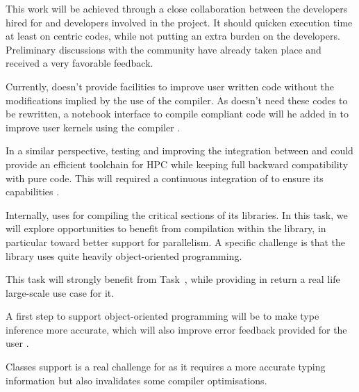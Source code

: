 \begin{workpackage}[id=hpc,wphases=0-48,
  title=High Performance Computing,
  PSRM=1, %
  LLRM=12, %
  SARM=18, %
  UKRM=1, %
  UBRM=1, %
  UJFRM=12]
\begin{tasklist}
\begin{task}[title=Pythran-Cython convergence,id=pythran-cython]
  This work will be achieved through a close collaboration between the \Pythran
  developers hired for \TheProject and \Cython developers involved in the \Sage
  project. It should quicken \Sage execution time at least on \Numpy centric
  codes, while not putting an extra burden on the developers.  Preliminary
  discussions with the \Cython community have already taken place and received a
  very favorable feedback.
\end{task}

\begin{task}[title=\Pythran for \Sage and \Sage Users,id=pythran-sage]

  Currently, \Sage doesn't provide facilities to improve user written
  \Python code without the modifications implied by the use of the \Cython
  compiler. As \Pythran doesn't need these codes to be rewritten, a notebook
  interface to compile \Pythran compliant code will he added in \Sage to
  improve user kernels using the \Pythran compiler .

  In a similar perspective, testing and improving the integration between
   and \Pythran could provide an efficient toolchain for HPC
  while keeping full backward compatibility with pure \Python code. This will
  required a continuous integration of \Pythran to ensure its capabilities
  .

  Internally, \Sage uses \Cython for compiling the critical sections of
  its libraries. In this task, we will explore opportunities to
  benefit from \Pythran compilation within the \Sage library, in
  particular toward better support for parallelism. A specific
  challenge is that the \Sage library uses quite heavily
  object-oriented programming.

  This task will strongly benefit from Task~,
  while providing in return a real life large-scale use case for it.

  A first step to support object-oriented programming will be to make
  \Pythran type inference more accurate, which will also improve error
  feedback provided for the user .
\end{task}

\begin{task}[title=Explorative task: Add support for classes in \Pythran.]
  Classes support is a real challenge for \Pythran as it requires a more
  accurate typing information but also invalidates some compiler optimisations.


\end{task}
\end{tasklist}
\end{workpackage}
